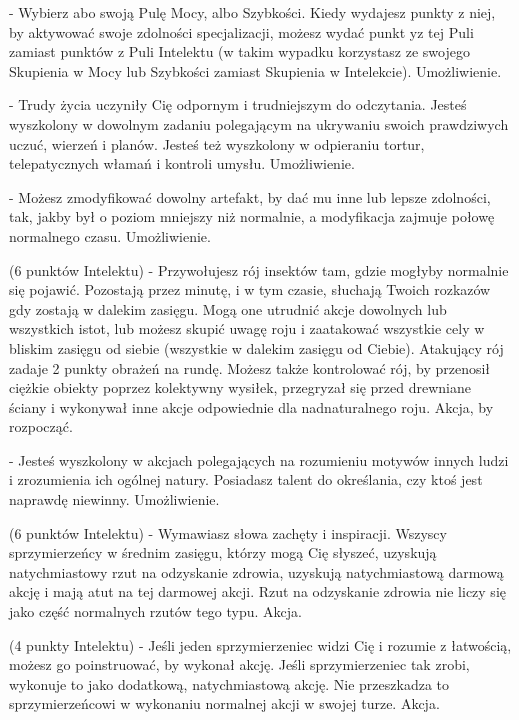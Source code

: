 { - Wybierz abo swoją Pulę Mocy, albo Szybkości. Kiedy wydajesz punkty z niej, by aktywować swoje zdolności specjalizacji, możesz wydać punkt yz tej Puli zamiast punktów z Puli Intelektu (w takim wypadku korzystasz ze swojego Skupienia w Mocy lub Szybkości zamiast Skupienia w Intelekcie). Umożliwienie.

 - Trudy życia uczyniły Cię odpornym i trudniejszym do odczytania. Jesteś wyszkolony w dowolnym zadaniu polegającym na ukrywaniu swoich prawdziwych uczuć, wierzeń i planów. Jesteś też wyszkolony w odpieraniu tortur, telepatycznych włamań i kontroli umysłu. Umożliwienie.

 - Możesz zmodyfikować dowolny artefakt, by dać mu inne lub lepsze zdolności, tak, jakby był o poziom mniejszy niż normalnie, a modyfikacja zajmuje połowę normalnego czasu. Umożliwienie.

 (6 punktów Intelektu) - Przywołujesz rój insektów tam, gdzie mogłyby normalnie się pojawić. Pozostają przez minutę, i w tym czasie, słuchają Twoich rozkazów gdy zostają w dalekim zasięgu. Mogą one utrudnić akcje dowolnych lub wszystkich istot, lub możesz skupić uwagę roju i zaatakować wszystkie cely w bliskim zasięgu od siebie (wszystkie w dalekim zasięgu od Ciebie). Atakujący rój zadaje 2 punkty obrażeń na rundę. Możesz także kontrolować rój, by przenosił ciężkie obiekty poprzez kolektywny wysiłek, przegryzał się przed drewniane ściany i wykonywał inne akcje odpowiednie dla nadnaturalnego roju. Akcja, by rozpocząć.

 - Jesteś wyszkolony w akcjach polegających na rozumieniu motywów innych ludzi i zrozumienia ich ogólnej natury. Posiadasz talent do określania, czy ktoś jest naprawdę niewinny. Umożliwienie.

 (6 punktów Intelektu) - Wymawiasz słowa zachęty i inspiracji. Wszyscy sprzymierzeńcy w średnim zasięgu, którzy mogą Cię słyszeć, uzyskują natychmiastowy rzut na odzyskanie zdrowia, uzyskują natychmiastową darmową akcję i mają atut na tej darmowej akcji. Rzut na odzyskanie zdrowia nie liczy się jako część normalnych rzutów tego typu. Akcja.

 (4 punkty Intelektu) - Jeśli jeden sprzymierzeniec widzi Cię i rozumie z łatwością, możesz go poinstruować, by wykonał akcję. Jeśli sprzymierzeniec tak zrobi, wykonuje to jako dodatkową, natychmiastową akcję. Nie przeszkadza to sprzymierzeńcowi w wykonaniu normalnej akcji w swojej turze. Akcja.

}
